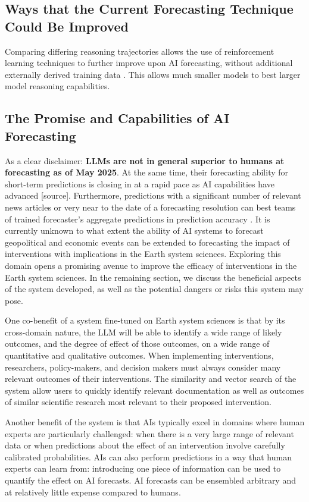 \documentclass[12pt,a4paper]{article}
\begin{document}
\subsection{Ways that the Current Forecasting Technique Could Be Improved}
Comparing differing reasoning trajectories allows the use of reinforcement learning techniques to further improve upon AI forecasting, without additional externally derived training data . This allows much smaller models to best larger model reasoning capabilities.


\subsection{The Promise and Capabilities of AI Forecasting}

As a clear disclaimer: \textbf{LLMs are not in general superior to humans at forecasting as of May 2025}. At the same time, their forecasting ability for short-term predictions is closing in at a rapid pace as AI capabilities have advanced [source]. Furthermore, predictions with a significant number of relevant news articles or very near to the date of a forecasting resolution can best teams of trained forecaster's aggregate predictions in prediction accuracy . It is currently unknown to what extent the ability of AI systems to forecast geopolitical and economic events can be extended to forecasting the impact of interventions with implications in the Earth system sciences. Exploring this domain opens a promising avenue to improve the efficacy of interventions in the Earth system sciences. In the remaining section, we discuss the beneficial aspects of the system developed, as well as the potential dangers or risks this system may pose.

One co-benefit of a system fine-tuned on Earth system sciences is that by its cross-domain nature, the LLM will be able to identify a wide range of likely outcomes, and the degree of effect of those outcomes, on a wide range of quantitative and qualitative outcomes. When implementing interventions, researchers, policy-makers, and decision makers must always consider many relevant outcomes of their interventions. The similarity and vector search of the system allow users to quickly identify relevant documentation as well as outcomes of similar scientific research most relevant to their proposed intervention.

Another benefit of the system is that AIs typically excel in domains where human experts are particularly challenged: when there is a very large range of relevant data or when predictions about the effect of an intervention involve carefully calibrated probabilities. AIs can also perform predictions in a way that human experts can learn from: introducing one piece of information can be used to quantify the effect on AI forecasts. AI forecasts can be ensembled arbitrary and at relatively little expense compared to humans. 
\end{document}
